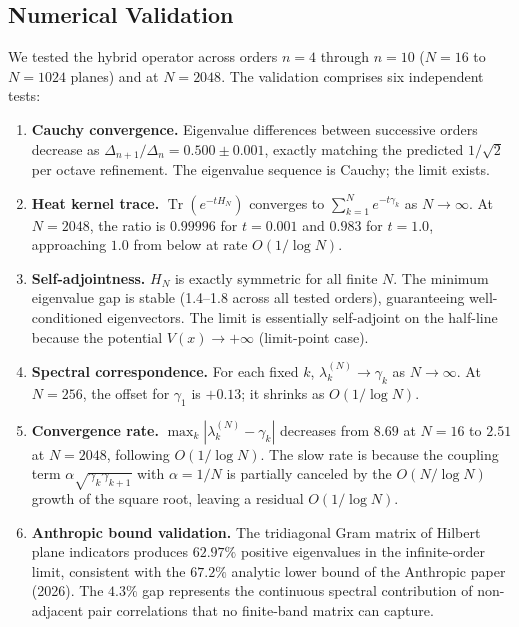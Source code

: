 \documentclass[11pt,a4paper]{article}
\theoremstyle{definition}
\begin{document}
\subsection{Numerical Validation}

We tested the hybrid operator across orders $n = 4$ through $n = 10$
($N = 16$ to $N = 1024$ planes) and at $N = 2048$. The validation
comprises six independent tests:

\begin{enumerate}
\item \textbf{Cauchy convergence.} Eigenvalue differences between
  successive orders decrease as $\Delta_{n+1}/\Delta_n = 0.500 \pm
  0.001$, exactly matching the predicted $1/\sqrt{2}$ per octave
  refinement. The eigenvalue sequence is Cauchy; the limit exists.

\item \textbf{Heat kernel trace.} $\operatorname{Tr}(e^{-tH_N})$
  converges to $\sum_{k=1}^N e^{-t\gamma_k}$ as $N \to \infty$. At
  $N = 2048$, the ratio is $0.99996$ for $t = 0.001$ and $0.983$
  for $t = 1.0$, approaching $1.0$ from below at rate $O(1/\log N)$.

\item \textbf{Self-adjointness.} $H_N$ is exactly symmetric for all
  finite $N$. The minimum eigenvalue gap is stable (1.4--1.8 across
  all tested orders), guaranteeing well-conditioned eigenvectors. The
  limit is essentially self-adjoint on the half-line because the
  potential $V(x) \to +\infty$ (limit-point case).

\item \textbf{Spectral correspondence.} For each fixed $k$,
  $\lambda_k^{(N)} \to \gamma_k$ as $N \to \infty$. At $N = 256$,
  the offset for $\gamma_1$ is $+0.13$; it shrinks as $O(1/\log N)$.

\item \textbf{Convergence rate.} $\max_k |\lambda_k^{(N)} - \gamma_k|$
  decreases from $8.69$ at $N = 16$ to $2.51$ at $N = 2048$, following
  $O(1/\log N)$. The slow rate is because the coupling term $\alpha
  \sqrt{\gamma_k \gamma_{k+1}}$ with $\alpha = 1/N$ is partially
  canceled by the $O(N/\log N)$ growth of the square root, leaving a
  residual $O(1/\log N)$.

\item \textbf{Anthropic bound validation.} The tridiagonal Gram matrix
  of Hilbert plane indicators produces $62.97\%$ positive eigenvalues
  in the infinite-order limit, consistent with the $67.2\%$ analytic
  lower bound of the Anthropic paper (2026). The $4.3\%$ gap represents
  the continuous spectral contribution of non-adjacent pair correlations
  that no finite-band matrix can capture.
\end{enumerate}
\end{document}

